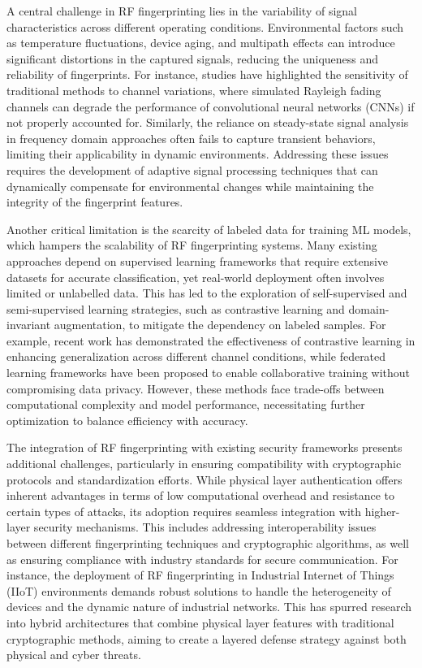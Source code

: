 \documentclass[conference]{IEEEtran}
\begin{document}
A central challenge in RF fingerprinting lies in the variability of signal characteristics across different operating conditions. Environmental factors such as temperature fluctuations, device aging, and multipath effects can introduce significant distortions in the captured signals, reducing the uniqueness and reliability of fingerprints. For instance, studies have highlighted the sensitivity of traditional methods to channel variations, where simulated Rayleigh fading channels can degrade the performance of convolutional neural networks (CNNs) if not properly accounted for. Similarly, the reliance on steady-state signal analysis in frequency domain approaches often fails to capture transient behaviors, limiting their applicability in dynamic environments. Addressing these issues requires the development of adaptive signal processing techniques that can dynamically compensate for environmental changes while maintaining the integrity of the fingerprint features.  

Another critical limitation is the scarcity of labeled data for training ML models, which hampers the scalability of RF fingerprinting systems. Many existing approaches depend on supervised learning frameworks that require extensive datasets for accurate classification, yet real-world deployment often involves limited or unlabelled data. This has led to the exploration of self-supervised and semi-supervised learning strategies, such as contrastive learning and domain-invariant augmentation, to mitigate the dependency on labeled samples. For example, recent work has demonstrated the effectiveness of contrastive learning in enhancing generalization across different channel conditions, while federated learning frameworks have been proposed to enable collaborative training without compromising data privacy. However, these methods face trade-offs between computational complexity and model performance, necessitating further optimization to balance efficiency with accuracy.  

The integration of RF fingerprinting with existing security frameworks presents additional challenges, particularly in ensuring compatibility with cryptographic protocols and standardization efforts. While physical layer authentication offers inherent advantages in terms of low computational overhead and resistance to certain types of attacks, its adoption requires seamless integration with higher-layer security mechanisms. This includes addressing interoperability issues between different fingerprinting techniques and cryptographic algorithms, as well as ensuring compliance with industry standards for secure communication. For instance, the deployment of RF fingerprinting in Industrial Internet of Things (IIoT) environments demands robust solutions to handle the heterogeneity of devices and the dynamic nature of industrial networks. This has spurred research into hybrid architectures that combine physical layer features with traditional cryptographic methods, aiming to create a layered defense strategy against both physical and cyber threats.  
\end{document}
